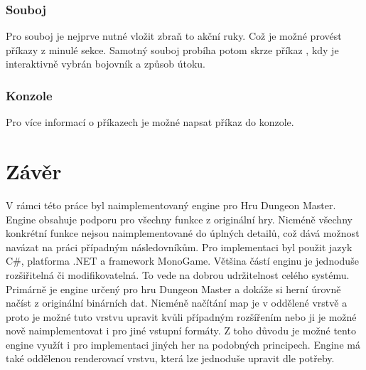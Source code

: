 \subsection{Souboj}
Pro souboj je nejprve nutné vložit zbraň to akční ruky. Což je možné provést příkazy z minulé sekce.
Samotný souboj probíha potom skrze příkaz , kdy je interaktivně vybrán bojovník a způsob útoku.

\subsection{Konzole}
Pro více informací o příkazech je možné napsat příkaz  do konzole.

\chapter*{Závěr}

V rámci této práce byl naimplementovaný engine pro Hru Dungeon Master. Engine 
obsahuje podporu pro všechny funkce z originální hry. Nicméně všechny konkrétní funkce
nejsou naimplementované do úplných detailů, což dává možnost navázat na práci případným následovníkům. 
 Pro implementaci byl použit jazyk C\#, platforma .NET
a framework MonoGame. Většina částí enginu je jednoduše rozšiřitelná či modifikovatelná.
To vede na dobrou udržitelnost celého systému. Primárně je engine určený pro hru 
Dungeon Master a dokáže si herní úrovně načíst z originální binárních dat. Nicméně
načítání map je v oddělené vrstvě a proto je možné tuto vrstvu upravit kvůli případným rozšířením nebo ji je možné
nově naimplementovat i pro 
jiné vstupní formáty. Z toho důvodu je možné tento engine využít i pro implementaci jiných her na podobných principech.
Engine má také oddělenou renderovací vrstvu, která lze jednoduše upravit dle potřeby.



